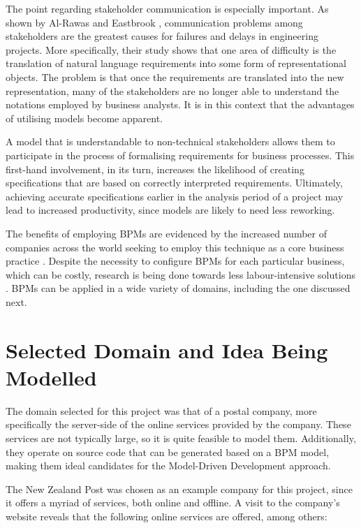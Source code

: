 \documentclass[11pt, a4paper, oneside, openright]{article}
\begin{document}
The point regarding stakeholder communication is especially important. As
shown by Al-Rawas and Eastbrook \cite{communication}, communication problems among stakeholders
are the greatest causes for failures and delays in engineering projects. More
specifically, their study shows that one area of difficulty is the translation
of natural language requirements into some form of representational objects. The
problem is that once the requirements are translated into the new
representation, many of the stakeholders are no longer able to understand the
notations employed by business analysts. It is in this context that the
advantages of utilising models become apparent.

A model that is understandable to non-technical stakeholders allows them to
participate in the process of formalising requirements for business processes.
This first-hand involvement, in its turn, increases the likelihood of creating
specifications that are based on correctly interpreted requirements. Ultimately,
achieving accurate specifications earlier in the analysis period of a project
may lead to increased productivity, since models are likely to need less
reworking.

The benefits of employing BPMs are evidenced by the increased number of
companies across the world seeking to employ this technique as a core
business practice \cite{bpmBenefits}. Despite the necessity to configure BPMs for each
particular business, which can be costly, research is being done towards
less labour-intensive solutions \cite{bpmCorrectness}. BPMs can be applied in a wide variety
of domains, including the one discussed next.


\section{Selected Domain and Idea Being Modelled}

The domain selected for this project was that of a postal company, more
specifically the server-side of the online services provided by the company.
These services are not typically large, so it is quite feasible to model them.
Additionally, they operate on source code that can be generated based on a BPM
model, making them ideal candidates for the Model-Driven Development approach.

The New Zealand Post was chosen as an example company for this project, since it
offers a myriad of services, both online and offline. A visit to the company’s
website \cite{nzPost} reveals that the following online services are offered, among
others:
\end{document}

